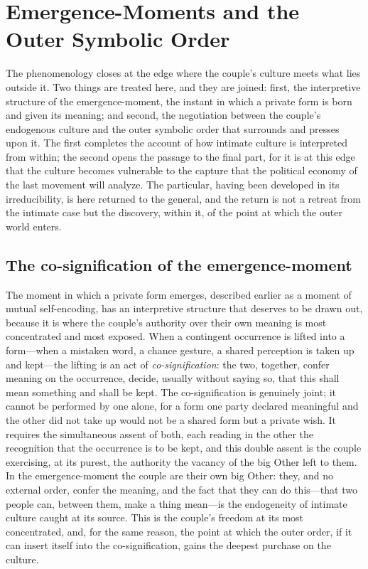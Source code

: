 \section{Emergence-Moments and the Outer Symbolic Order}
\label{p24:sec:negotiation}

\noindent
The phenomenology closes at the edge where the couple's culture meets what lies outside it. Two things are treated here, and they are joined: first, the interpretive structure of the emergence-moment, the instant in which a private form is born and given its meaning; and second, the negotiation between the couple's endogenous culture and the outer symbolic order that surrounds and presses upon it. The first completes the account of how intimate culture is interpreted from within; the second opens the passage to the final part, for it is at this edge that the culture becomes vulnerable to the capture that the political economy of the last movement will analyze. The particular, having been developed in its irreducibility, is here returned to the general, and the return is not a retreat from the intimate case but the discovery, within it, of the point at which the outer world enters.

\subsection*{The co-signification of the emergence-moment}

The moment in which a private form emerges, described earlier as a moment of mutual self-encoding, has an interpretive structure that deserves to be drawn out, because it is where the couple's authority over their own meaning is most concentrated and most exposed. When a contingent occurrence is lifted into a form---when a mistaken word, a chance gesture, a shared perception is taken up and kept---the lifting is an act of \emph{co-signification}: the two, together, confer meaning on the occurrence, decide, usually without saying so, that this shall mean something and shall be kept. The co-signification is genuinely joint; it cannot be performed by one alone, for a form one party declared meaningful and the other did not take up would not be a shared form but a private wish. It requires the simultaneous assent of both, each reading in the other the recognition that the occurrence is to be kept, and this double assent is the couple exercising, at its purest, the authority the vacancy of the big Other left to them. In the emergence-moment the couple are their own big Other: they, and no external order, confer the meaning, and the fact that they can do this---that two people can, between them, make a thing mean---is the endogeneity of intimate culture caught at its source. This is the couple's freedom at its most concentrated, and, for the same reason, the point at which the outer order, if it can insert itself into the co-signification, gains the deepest purchase on the culture.


